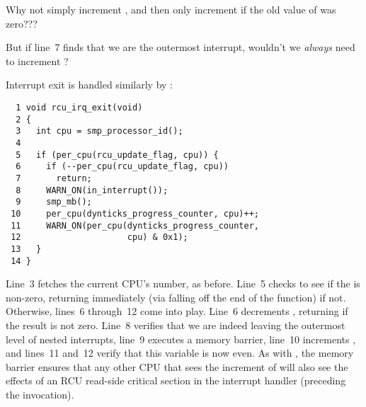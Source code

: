 \QuickQuiz{}
	Why not simply increment , and then only
	increment  if the old value
	of  was zero???
 \QuickQuizEnd

\QuickQuiz{}
	But if line~7 finds that we are the outermost interrupt,
	wouldn't we \emph{always} need to increment
	?
 \QuickQuizEnd

Interrupt exit is handled similarly by
:

{ \scriptsize
\begin{verbatim}
  1 void rcu_irq_exit(void)
  2 {
  3   int cpu = smp_processor_id();
  4
  5   if (per_cpu(rcu_update_flag, cpu)) {
  6     if (--per_cpu(rcu_update_flag, cpu))
  7       return;
  8     WARN_ON(in_interrupt());
  9     smp_mb();
 10     per_cpu(dynticks_progress_counter, cpu)++;
 11     WARN_ON(per_cpu(dynticks_progress_counter,
 12                     cpu) & 0x1);
 13   }
 14 }
\end{verbatim}
}

Line~3 fetches the current CPU's number, as before.
Line~5 checks to see if the  is
non-zero, returning immediately (via falling off the end of the
function) if not.
Otherwise, lines~6 through~12 come into play.
Line~6 decrements , returning
if the result is not zero.
Line~8 verifies that we are indeed leaving the outermost
level of nested interrupts, line~9 executes a memory barrier,
line~10 increments ,
and lines~11 and~12 verify that this variable is now even.
As with , the memory barrier ensures that
any other CPU that sees the increment of
will also see the effects of an RCU read-side critical section
in the interrupt handler (preceding the 
invocation).

